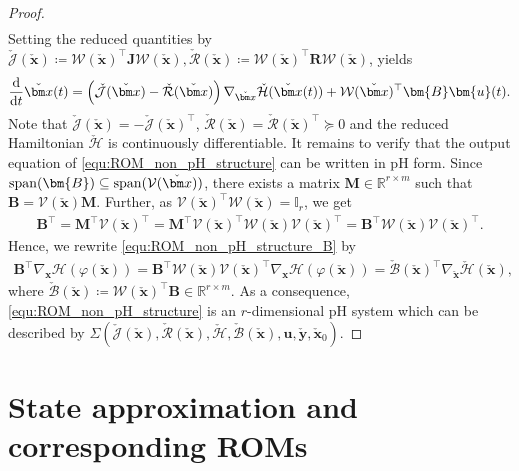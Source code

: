 \documentclass{article}
\newcommand{\bmB}{\bm{B}}
\newcommand{\R}{\mathbb{R}}
\newcommand{\curlyH}{\mathcal{H}}
\newcommand{\curlyHr}{\check{\mathcal{H}}}
\newcommand{\statex}{{\bm x}}
\newcommand{\stateRed}{\check{\bm x}}
\newcommand{\outputRed}{\check{\bm y}}
\newcommand{\stateRedT}{\stateRed(t)}
\newcommand{\inputu}{\bm{u}}
\newcommand{\ddt}{\frac{\rm d}{{\rm d} t}}
\newcommand{\SysLable}{\Sigma}
\newcommand{\portsize}{m}
\newcommand{\ROMsize}{r}
\newcommand{\approxfunc}{\varphi}
\newcommand{\funcV}{\mathcal{V}}
\newcommand{\funcW}{\mathcal{W}}
\newcommand{\funcJ}{\bm{J}}
\newcommand{\funcR}{\bm{R}}
\newcommand{\funcJr}{\check{\mathcal{J}}}
\newcommand{\funcRr}{\check{\mathcal{R}}}
\newcommand{\funcHr}{\check{\mathcal{H}}}
\newcommand{\funcBr}{\check{\mathcal{B}}}
\newcommand{\pH}{\textsf{pH}\xspace}
\newcommand{\ROMs}{\textsf{ROM}s\xspace}
\begin{document}
\begin{proof}
\begin{align*}
\end{align*}
Setting the reduced quantities by 
$
		\funcJr(\stateRed) \coloneqq\funcW(\stateRed)^{\top}\funcJ\funcW(\stateRed), 
		\funcRr(\stateRed) \coloneqq\funcW(\stateRed)^{\top}\funcR\funcW(\stateRed)$,
yields
\begin{align*}
	\ddt \stateRedT =\left( \funcJr(\stateRed) - \funcRr(\stateRed)  \right) \nabla_{\stateRed}\curlyHr(\stateRedT)  + \funcW(\stateRed)^{\top}\bmB\inputu(t).
\end{align*}
Note that $\funcJr(\stateRed) = -\funcJr(\stateRed)^{\top}$, $\funcRr(\stateRed) = \funcRr(\stateRed)^{\top} \succeq 0$ and the reduced Hamiltonian $\curlyHr$ is continuously differentiable. It remains to verify that the output equation of \eqref{equ:ROM_non_pH_structure} can be written in \pH form. 
Since ${\rm span}(\bmB)\subseteq{\rm span}(\funcV(\stateRed))$, there exists a matrix $\bm{M} \in \R^{\ROMsize \times \portsize}$ such that $\bmB =\funcV(\stateRed) \bm{M} $. Further, as $\funcV(\stateRed)^{\top}\funcW(\stateRed) = \mathbb{I}_r$, we get 
\begin{align}
	\label{equ:cond_on_B}
	\bmB^{\top}=  \bm{M}^{\top}  \funcV(\stateRed)^{\top} =  \bm{M}^{\top} \funcV(\stateRed)^{\top}\funcW(\stateRed)  \funcV(\stateRed)^{\top} = \bmB^{\top}\funcW(\stateRed) \funcV(\stateRed)^{\top}.
\end{align}		
Hence, we rewrite \eqref{equ:ROM_non_pH_structure_B} by	
\begin{align*}
	\bmB^{\top}\nabla_{\statex}\curlyH(\approxfunc(\stateRed)) =\bmB^{\top}\funcW(\stateRed) \funcV(\stateRed)^{\top}\nabla_{\statex}\curlyH(\approxfunc(\stateRed)) =\funcBr(\stateRed)^{\top}\nabla_{\stateRed}\curlyHr(\stateRed),
\end{align*}
where $\funcBr(\stateRed)\coloneqq\funcW(\stateRed)^{\top}\bmB \in \R^{\ROMsize \times \portsize}$. As a consequence, \eqref{equ:ROM_non_pH_structure} is an $\ROMsize$-dimensional \pH system which can be described by $\SysLable(\funcJr(\stateRed),\funcRr(\stateRed),\funcHr,\funcBr(\stateRed),\inputu,\outputRed,\stateRed_0)$.
\end{proof}

								
\section{State approximation and corresponding \ROMs}
\label{Sec:GMG_state_approx}
\end{document}
